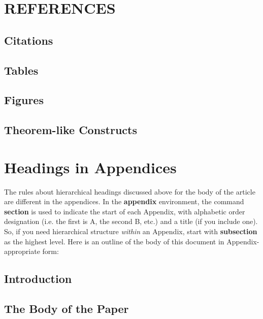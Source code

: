 \documentclass{acm_proc_article-sp}
\begin{document}
\section{REFERENCES}

\subsection{Citations}

\subsection{Tables}

\subsection{Figures}

\subsection{Theorem-like Constructs}


%

%
%
\appendix
\section{Headings in Appendices}
The rules about hierarchical headings discussed above for
the body of the article are different in the appendices.
In the \textbf{appendix} environment, the command
\textbf{section} is used to
indicate the start of each Appendix, with alphabetic order
designation (i.e. the first is A, the second B, etc.) and
a title (if you include one).  So, if you need
hierarchical structure
\textit{within} an Appendix, start with \textbf{subsection} as the
highest level. Here is an outline of the body of this
document in Appendix-appropriate form:
\subsection{Introduction}
\subsection{The Body of the Paper}
\end{document}
